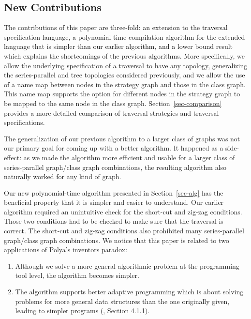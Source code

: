 \subsection{New Contributions}

The contributions of this paper are three-fold: an extension to the
traversal specification language, a polynomial-time compilation
algorithm for the extended language that is simpler than our earlier
algorithm, and a lower bound result which explains the shortcomings of
the previous algorithms.  More specifically, we allow the underlying
specification of a traversal to have any topology, generalizing the
series-parallel and tree topologies considered previously, and we
allow the use of a name map between nodes in the strategy graph and
those in the class graph. This name map supports the option for
different nodes in the strategy graph to be mapped to the same node in
the class graph.  Section~\ref{sec-comparison} provides a more
detailed comparison of traversal strategies and traversal
specifications.

The generalization of our previous algorithm to a larger class of
graphs was not our primary goal for coming up with a better
algorithm. It happened as a side-effect: as we made the algorithm more
efficient and usable for a larger class of series-parallel graph/class
graph combinations, the resulting algorithm also naturally worked for
any kind of graph.

Our new polynomial-time algorithm presented in Section~\ref{sec-alg}
has the beneficial property that it is simpler and easier to
understand. Our earlier algorithm required an unintuitive check for
the short-cut and zig-zag conditions. Those two conditions had to be
checked to make sure that the traversal is correct. The short-cut and
zig-zag conditions also prohibited many series-parallel graph/class
graph combinations. We notice that this paper is related to two
applications of Polya's inventors paradox\cite{polya:solve-it}:
\begin{enumerate}
\item Although we solve a more general algorithmic problem at the
      programming tool level, the algorithm becomes simpler.
\item The algorithm supports better adaptive programming which is
      about solving problems for more general data structures than the
      one originally given, leading to simpler programs
      (\cite{karl:demeter}, Section 4.1.1).
\end{enumerate}

